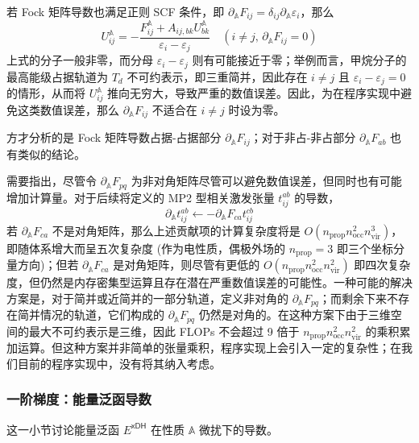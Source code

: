 若 Fock 矩阵导数也满足正则 SCF 条件，即 $\partial_\mathbb{A} F_{ij} = \delta_{ij} \partial_\mathbb{A} \varepsilon_i$，那么
\begin{equation}
  U_{ij}^\mathbb{A} = - \frac{F_{ij}^\mathbb{A} + A_{ij, bk} U_{bk}^\mathbb{A}}{\varepsilon_i - \varepsilon_j} \quad \left( i \neq j, \, \partial_\mathbb{A} F_{ij} = 0 \right)
\end{equation}
上式的分子一般非零，而分母 $\varepsilon_i - \varepsilon_j$ 则有可能接近于零；举例而言，甲烷分子的最高能级占据轨道为 $T_d$ 不可约表示，即三重简并，因此存在 $i \neq j$ 且 $\varepsilon_i - \varepsilon_j = 0$ 的情形，从而将 $U_{ij}^\mathbb{A}$ 推向无穷大，导致严重的数值误差。因此，为在程序实现中避免这类数值误差，那么 $\partial_\mathbb{A} F_{ij}$ 不适合在 $i \neq j$ 时设为零。

方才分析的是 Fock 矩阵导数占据-占据部分 $\partial_\mathbb{A} F_{ij}$；对于非占-非占部分 $\partial_\mathbb{A} F_{ab}$ 也有类似的结论。

需要指出，尽管令 $\partial_\mathbb{A} F_{pq}$ 为非对角矩阵尽管可以避免数值误差，但同时也有可能增加计算量。对于后续将定义的 MP2 型相关激发张量 $t_{ij}^{ab}$ 的导数，
\begin{equation*}
  \partial_\mathbb{A} t_{ij}^{ab} \leftarrow - \partial_\mathbb{A} F_{ca} t_{ij}^{cb}
\end{equation*}
若 $\partial_\mathbb{A} F_{ca}$ 不是对角矩阵，那么上述贡献项的计算复杂度将是 $O(n_\mathrm{prop} n_\mathrm{occ}^2 n_\mathrm{vir}^3)$，即随体系增大而呈五次复杂度 (作为电性质，偶极外场的 $n_\mathrm{prop} = 3$ 即三个坐标分量方向)；但若 $\partial_\mathbb{A} F_{ca}$ 是对角矩阵，则尽管有更低的 $O(n_\mathrm{prop} n_\mathrm{occ}^2 n_\mathrm{vir}^2)$ 即四次复杂度，但仍然是内存密集型运算且存在潜在严重数值误差的可能性。一种可能的解决方案是，对于简并或近简并的一部分轨道，定义非对角的 $\partial_\mathbb{A} F_{pq}$；而剩余下来不存在简并情况的轨道，它们构成的 $\partial_\mathbb{A} F_{pq}$ 仍然是对角的。在这种方案下由于三维空间的最大不可约表示是三维，因此 FLOPs 不会超过 9 倍于 $n_\mathrm{prop} n_\mathrm{occ}^2 n_\mathrm{vir}^2$ 的乘积累加运算\cite{Stoychev-Neese.JCTC.2018}。但这种方案并非简单的张量乘积，程序实现上会引入一定的复杂性；在我们目前的程序实现中，没有将其纳入考虑。

\subsubsection{一阶梯度：能量泛函导数}

这一小节讨论能量泛函 $E^\textsf{xDH}$ 在性质 $\mathbb{A}$ 微扰下的导数。

